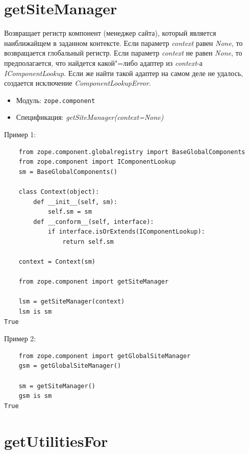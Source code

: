 \documentclass[a4paper,openany,twoside,draft]{book}
\providecommand*{\DUroletitlereference}[1]{\textsl{#1}}
\begin{document}
\section*{getSiteManager%
  \label{getsitemanager}%
}

Возвращает регистр компонент (менеджер сайта), который является наиближайщем в заданном контексте. Если параметр \DUroletitlereference{context} равен \DUroletitlereference{None}, то возвращается глобальный регистр.  Если параметр \DUroletitlereference{context} не равен \DUroletitlereference{None}, то предполагается, что найдется какой"=либо адаптер из \DUroletitlereference{context}-а \DUroletitlereference{IComponentLookup}.  Если же найти такой адаптер на самом деле не удалось, создается исключение \DUroletitlereference{ComponentLookupError}.

\begin{itemize}

\item Модуль: \texttt{zope.component}

\item Спецификация: \DUroletitlereference{getSiteManager(context=None)}

\end{itemize}

Пример 1:

\begin{verbatim}
    from zope.component.globalregistry import BaseGlobalComponents
    from zope.component import IComponentLookup
    sm = BaseGlobalComponents()

    class Context(object):
        def __init__(self, sm):
            self.sm = sm
        def __conform__(self, interface):
            if interface.isOrExtends(IComponentLookup):
                return self.sm

    context = Context(sm)

    from zope.component import getSiteManager

    lsm = getSiteManager(context)
    lsm is sm
True
\end{verbatim}

Пример 2:

\begin{verbatim}
    from zope.component import getGlobalSiteManager
    gsm = getGlobalSiteManager()

    sm = getSiteManager()
    gsm is sm
True
\end{verbatim}


\section*{getUtilitiesFor%
  \label{getutilitiesfor}%
}
\end{document}
